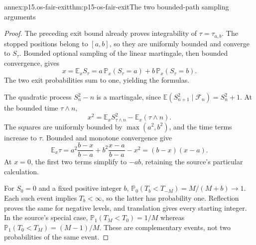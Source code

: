 \begin{annexitem}{annex:p15.os-fair-exit}{thm:p15-os-fair-exit}{The two bounded-path sampling arguments}
\begin{proof}
The preceding exit bound already proves integrability of
\(\tau=\tau_{a,b}\). The stopped positions belong to \([a,b]\),
so they are uniformly bounded and converge to \(S_\tau\).
Bounded optional sampling of the linear martingale, then
bounded convergence, gives
\[
 x=\mathbb E_xS_\tau
   =a\,\mathbb P_x(S_\tau=a)+b\,\mathbb P_x(S_\tau=b).
 \]
The two exit probabilities sum to one, yielding the formulas.

The quadratic process \(S_n^2-n\) is a martingale, since
\(\mathbb E(S_{n+1}^2\mid\mathcal F_n)=S_n^2+1\).
At the bounded time \(\tau\wedge n\),
\[
 x^2=\mathbb E_xS_{\tau\wedge n}^2-\mathbb E_x(\tau\wedge n).
 \]
The squares are uniformly bounded by
\(\max(a^2,b^2)\), and the time terms increase to \(\tau\).
Bounded and monotone convergence give
\[
 \mathbb E_x\tau
 =a^2\frac{b-x}{b-a}+b^2\frac{x-a}{b-a}-x^2
 =(b-x)(x-a).
 \]
At \(x=0\), the first two terms simplify to \(-ab\),
retaining the source's particular calculation.

For \(S_0=0\) and a fixed positive integer \(b\),
\(\mathbb P_0(T_b<T_{-M})=M/(M+b)\to1\).
Each such event implies \(T_b<\infty\), so the latter has
probability one. Reflection proves the same for negative levels,
and translation gives every starting integer.
In the source's special case,
\(\mathbb P_1(T_M<T_0)=1/M\) whereas
\(\mathbb P_1(T_0<T_M)=(M-1)/M\).
These are complementary events, not two probabilities of the
same event.
\end{proof}
\end{annexitem}

